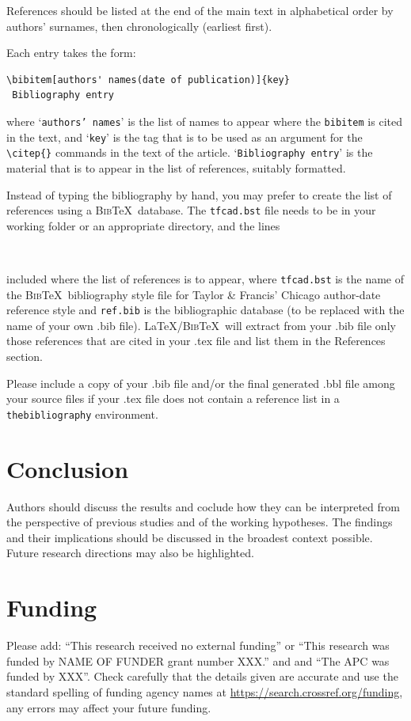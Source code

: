 \documentclass[12pt]{gsis}  %
\begin{document}
References should be listed at the end of the main text in alphabetical order by authors' surnames, then chronologically (earliest first).

Each entry takes the form:
\begin{verbatim}
\bibitem[authors' names(date of publication)]{key}
 Bibliography entry
\end{verbatim}
where `\texttt{authors' names}' is the list of names to appear where the \verb"bibitem" is cited in the text, and `\texttt{key}' is the tag that is to be used as an argument for the \verb"\citep{}" commands in the text of the article. `\texttt{Bibliography entry}' is the material that is to appear in the list of references, suitably formatted. 

Instead of typing the bibliography by hand, you may prefer to create the list of references using a \textsc{Bib}\TeX\ database. The \texttt{tfcad.bst} file needs to be in your working folder or an appropriate directory, and the lines
\begin{verbatim}


\end{verbatim}
included where the list of references is to appear, where \texttt{tfcad.bst} is the name of the \textsc{Bib}\TeX\ bibliography style file for Taylor \& Francis' Chicago author-date reference style and \texttt{ref.bib} is the bibliographic database (to be replaced with the name of your own .bib file). \LaTeX/\textsc{Bib}\TeX\ will extract from your .bib file only those references that are cited in your .tex file and list them in the References section.

Please include a copy of your .bib file and/or the final generated .bbl file among your source files if your .tex file does not contain a reference list in a \texttt{thebibliography} environment.

\section{Conclusion}
Authors should discuss the results and coclude how they can be interpreted from the perspective of previous studies and of the working hypotheses. The findings and their implications should be discussed in the broadest context possible. Future research directions may also be highlighted.


\section*{Funding}
Please add: ``This research received no external funding'' or ``This research was funded by NAME OF FUNDER grant number XXX.'' and  and ``The APC was funded by XXX''. Check carefully that the details given are accurate and use the standard spelling of funding agency names at \url{https://search.crossref.org/funding}, any errors may affect your future funding.
\end{document}
